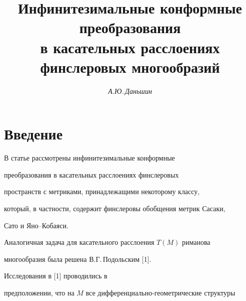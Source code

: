 

\author{\it А.Ю.\,Даньшин}




\title{Инфинитезимальные конформные преобразования\\


в касательных расслоениях\\ финслеровых многообразий}





\date{}







\pagestyle{plain} %













\maketitle


\label{begin}





\section*{Введение}





В статье рассмотрены инфинитезимальные конформные


преобразования в касательных расслоениях финслеровых


пространств с метриками, принадлежащими некоторому классу,


который, в частности, содержит финслеровы обобщения метрик Сасаки,


Сато и Яно--Кобаяси.


Аналогичная задача для касательного расслоения $T(M)$ риманова


многообразия была решена В.Г.\,Подольским [1]. 


Исследования в [1] проводились в


предположении, что на $M$ все дифференциально-геометрические структуры


